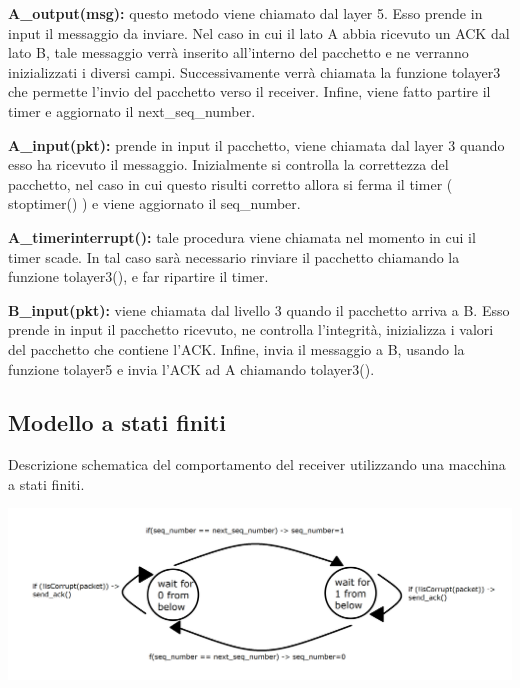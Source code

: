 \documentclass[a4paper]{article}
\begin{document}
\begin{flushleft}
\textbf{A\_output(msg):}
 questo metodo viene chiamato dal layer 5. Esso prende in input il messaggio da inviare. Nel caso in cui il lato A abbia ricevuto un ACK dal lato B, tale messaggio verrà inserito all’interno del pacchetto e ne verranno inizializzati i diversi campi. Successivamente verrà chiamata la funzione tolayer3 che permette l’invio del pacchetto verso il receiver. Infine, viene fatto partire il timer e aggiornato il next\_seq\_number.
\end{flushleft}

\begin{flushleft}
\textbf{A\_input(pkt):} 
prende in input il pacchetto, viene chiamata dal layer 3 quando esso ha ricevuto il messaggio. Inizialmente si controlla la correttezza del pacchetto, nel caso in cui questo risulti corretto allora si ferma il timer ( stoptimer() ) e viene aggiornato il seq\_number. 
\end{flushleft}

\begin{flushleft}
\textbf{A\_timerinterrupt():} 
tale procedura viene chiamata nel momento in cui il timer scade. In tal caso sarà necessario rinviare il pacchetto chiamando la funzione tolayer3(), e far ripartire il timer.
\end{flushleft}

\begin{flushleft}
\textbf{B\_input(pkt): }
viene chiamata dal livello 3 quando il pacchetto arriva a B. Esso prende in input il pacchetto ricevuto, ne controlla l’integrità, inizializza i valori del pacchetto che contiene l’ACK. Infine, invia il messaggio a B, usando la funzione tolayer5 e invia l’ACK ad A chiamando tolayer3().
\end{flushleft}


\subsection{Modello a stati finiti}
Descrizione schematica del comportamento del receiver utilizzando una macchina a stati finiti.\par
\includegraphics[width=\linewidth]{MSF.png}
\end{document}
